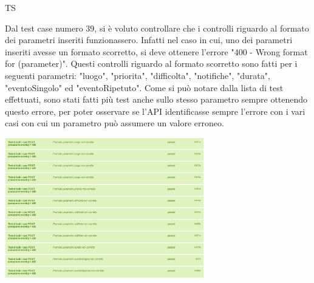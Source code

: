 \begin{listaPersonale}{TS}
\begin{center}
                \end{center}
                Dal test case numero 39, si è voluto controllare che i controlli riguardo al formato dei parametri inseriti funzionassero. Infatti nel caso in cui, uno dei parametri inseriti avesse un formato scorretto, si deve ottenere l'errore "400 - Wrong format for (parameter)". Questi controlli riguardo al formato scorretto sono fatti per i seguenti parametri: "luogo", "priorita", "difficolta", "notifiche", "durata", "eventoSingolo" ed "eventoRipetuto". Come si può notare dalla lista di test effettuati, sono stati fatti più test anche sullo stesso parametro sempre ottenendo questo errore, per poter osservare se l'API identificasse sempre l'errore con i vari casi con cui un parametro può assumere un valore erroneo.
                \begin{center}
                        \includegraphics[width=0.65\textwidth, height=0.3\textheight]{img/png/tests/EventoPost/400_wrongFormat_PostEvento.png}
                \end{center}

\end{listaPersonale}
